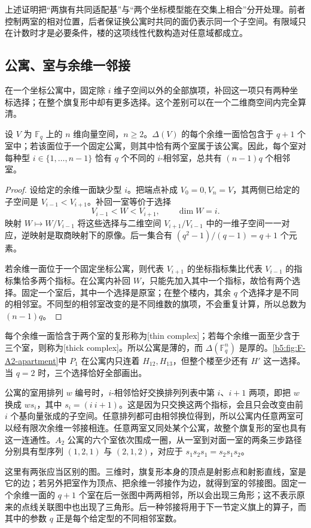 上述证明把“两旗有共同适配基”与“两个坐标模型能在交集上相合”分开处理。前者控制两室的相对位置，后者保证换公寓时共同的面仍表示同一个子空间。有限域只在计数时才是必要条件，楼的这项线性代数构造对任意域都成立。

\subsection{公寓、室与余维一邻接}
\label{b5:subsec:F03:03}

在一个坐标公寓中，固定除 \(i\) 维子空间以外的全部旗项，补回这一项只有两种坐标选择；在整个旗复形中却有更多选择。这个差别可以在一个二维商空间内完全算清。

\begin{proposition}\label{b5:prop:F-panel-count}
	设 \(V\) 为 \(\mathbb F_q\) 上的 \(n\) 维向量空间，\(n\ge2\)。\(\Delta(V)\) 的每个余维一面恰包含于 \(q+1\) 个室中；若该面位于一个固定公寓，则其中恰有两个室属于该公寓。因此，每个室对每种型 \(i\in\{1,\ldots,n-1\}\) 恰有 \(q\) 个不同的 \(i\)-相邻室，总共有 \((n-1)q\) 个相邻室。
\end{proposition}

\begin{proof}
	设给定的余维一面缺少型 \(i\)。把端点补成 \(V_0=0,V_n=V\)，其两侧已给定的子空间是 \(V_{i-1}<V_{i+1}\)。补回一室等价于选择
	\[
		V_{i-1}<W<V_{i+1},\qquad \dim W=i.
	\]
	映射 \(W\mapsto W/V_{i-1}\) 将这些选择与二维空间 \(V_{i+1}/V_{i-1}\) 中的一维子空间一一对应，逆映射是取商映射下的原像。后一集合有 \((q^2-1)/(q-1)=q+1\) 个元素。

	若余维一面位于一个固定坐标公寓，则代表 \(V_{i+1}\) 的坐标指标集比代表 \(V_{i-1}\) 的指标集恰多两个指标。在公寓内补回 \(W\)，只能先加入其中一个指标，故恰有两个选择。固定一个室后，其中一个选择是原室；在整个楼内，其余 \(q\) 个选择才是不同的相邻室。不同型的相邻室改变的是不同维数的旗项，不会重复计算，所以总数为 \((n-1)q\)。
\end{proof}

每个余维一面恰含于两个室的复形称为[thin complex]；若每个余维一面至少含于三个室，则称为[thick complex]。所以公寓是薄的，而 \(\Delta(\mathbb F_q^n)\) 是厚的。\cref{b5:fig:F-A2-apartment}中 \(P_1\) 在公寓内只连着 \(H_{12},H_{13}\)，但整个楼至少还有 \(H'\) 这一选择。当 \(q=2\) 时，三个选择恰好全部画出。

\ProseParagraphBreak

公寓的室用排列 \(w\) 编号时，\(i\)-相邻恰好交换排列列表中第 \(i\)、\(i+1\) 两项，即把 \(w\) 换成 \(ws_i\)，其中 \(s_i=(i\ i+1)\)。这是因为只交换这两个指标，会且只会改变由前 \(i\) 个基向量张成的子空间。任意排列都可由相邻换位得到，所以公寓内任意两室可以经有限次余维一邻接相连。任意两室又同处某个公寓，故整个旗复形的室也具有这一连通性。\(A_2\) 公寓的六个室依次围成一圈，从一室到对面一室的两条三步路径分别具有型序列 \((1,2,1)\) 与 \((2,1,2)\)，对应于 \(s_1s_2s_1=s_2s_1s_2\)。

\ProseParagraphBreak

这里有两张应当区别的图。三维时，旗复形本身的顶点是射影点和射影直线，室是它的边；若另外把室作为顶点、把余维一邻接作为边，就得到室的邻接图。固定一个余维一面的 \(q+1\) 个室在后一张图中两两相邻，所以会出现三角形；这不表示原来的点线关联图中也出现了三角形。后一种邻接将用于下一节定义旗上的算子，而其中的参数 \(q\) 正是每个给定型的不同相邻室数。
